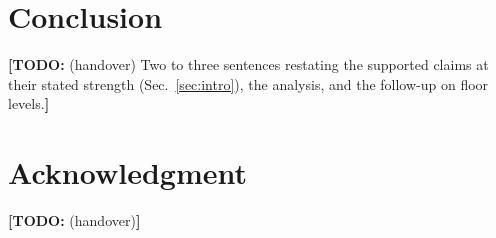 \documentclass[journal]{IEEEtran}
\newcommand{\TODO}[1]{{\color{red}\textbf{[TODO:} #1\textbf{]}}}
\begin{document}
\section{Conclusion}
\label{sec:conclusion}
\TODO{(handover) Two to three sentences restating the supported claims at
their stated strength (Sec.~\ref{sec:intro}), the analysis, and the follow-up
on floor levels.}

\section*{Acknowledgment}
\TODO{(handover)}



\end{document}
